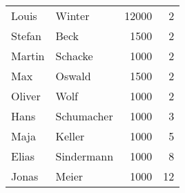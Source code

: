 \begin{center}
    \begin{small}
        \tablehead{}
        \begin{msoraclesql}
            \begin{supertabular}{llrr}
                Louis & Winter & 12000 & 2 \\
                Stefan & Beck & 1500 & 2 \\
                Martin & Schacke & 1000 & 2 \\
                Max & Oswald & 1500 & 2 \\
                Oliver & Wolf & 1000 & 2 \\
                Hans & Schumacher & 1000 & 3 \\
                Maja & Keller & 1000 & 5 \\
                Elias & Sindermann & 1000 & 8 \\
                Jonas & Meier & 1000 & 12 \\
            \end{supertabular}
        \end{msoraclesql}
    \end{small}
\end{center}
